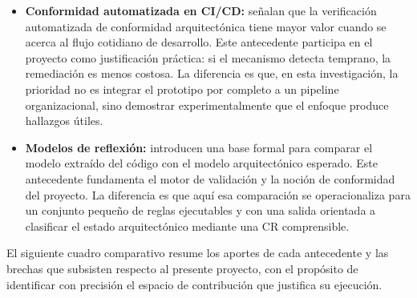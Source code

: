 \begin{itemize}
    \item \textbf{Conformidad automatizada en CI/CD:} \textcite{Klein2022} señalan que la verificación automatizada de conformidad arquitectónica tiene mayor valor cuando se acerca al flujo cotidiano de desarrollo. Este antecedente participa en el proyecto como justificación práctica: si el mecanismo detecta temprano, la remediación es menos costosa. La diferencia es que, en esta investigación, la prioridad no es integrar el prototipo por completo a un pipeline organizacional, sino demostrar experimentalmente que el enfoque produce hallazgos útiles.

    \item \textbf{Modelos de reflexión:} \textcite{Murphy2001} introducen una base formal para comparar el modelo extraído del código con el modelo arquitectónico esperado. Este antecedente fundamenta el motor de validación y la noción de conformidad del proyecto. La diferencia es que aquí esa comparación se operacionaliza para un conjunto pequeño de reglas ejecutables y con una salida orientada a clasificar el estado arquitectónico mediante una CR comprensible.
\end{itemize}

El siguiente cuadro comparativo resume los aportes de cada antecedente y las brechas que subsisten respecto al presente proyecto, con el propósito de identificar con precisión el espacio de contribución que justifica su ejecución.


